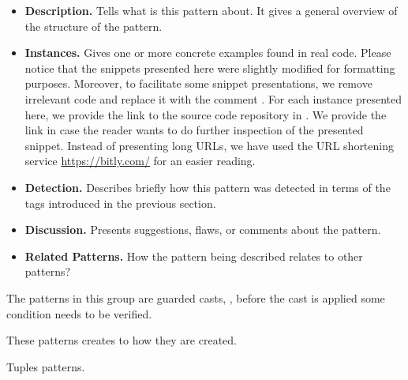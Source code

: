 \begin{itemize}
\item \textbf{Description.}
Tells what is this pattern about.
It gives a general overview of the structure of the pattern.
\item \textbf{Instances.}
Gives one or more concrete examples found in real code.
Please notice that the snippets presented here were slightly
modified for formatting purposes.
Moreover, to facilitate some snippet presentations,
we remove irrelevant code and replace it with the
comment \code{// [...]}.
For each instance presented here, we provide the link to the source code repository in \lgtm{}.
We provide the link in case the reader wants to do further inspection
of the presented snippet.
Instead of presenting \lgtm{} long URLs,
we have used the URL shortening service \url{https://bitly.com/}
for an easier reading.
\item \textbf{Detection.}
Describes briefly how this pattern was detected in terms of the tags introduced in the previous section.
\item \textbf{Discussion.}
Presents suggestions, flaws, or comments about the pattern.
\item \textbf{Related Patterns.}
How the pattern being described relates to other patterns?
\end{itemize}




The patterns in this group are guarded casts, \ie, before the cast is applied some condition needs to be verified.







These patterns creates to how they are created.











Tuples patterns.






